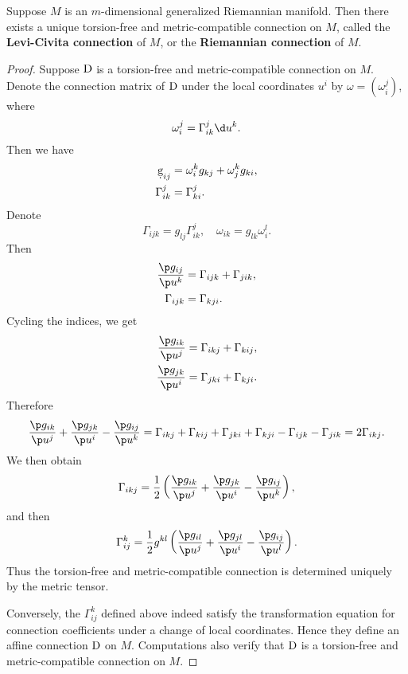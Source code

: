 \documentclass[11pt]{article}
\begin{document}
\begin{theorem}
    Suppose $M$ is an $m$-dimensional generalized Riemannian manifold. Then there exists a unique torsion-free and metric-compatible connection on $M$, called the \textbf{Levi-Civita connection} of $M$, or the \textbf{Riemannian connection} of $M$. 
\end{theorem}
\begin{proof}
    Suppose $\text{D}$ is a torsion-free and metric-compatible connection on $M$. Denote the connection matrix of $\text{D}$ under the local coordinates $u^i$ by $\omega = (\omega^j_i)$, where $$\omega^j_i = \Gamma^j_{ik}\d u^k.$$ Then we have 
    \begin{align*}
        \d g_{ij} &= \omega^k_i g_{kj} + \omega^k_j g_{ki}, \\
        \Gamma^j_{ik} &= \Gamma^j_{ki}.
    \end{align*}
    Denote $$\Gamma_{ijk} = g_{lj}\Gamma^j_{ik}, \quad \omega_{ik} = g_{lk}\omega^l_i.$$ Then 
    \begin{align*}
        \frac{\p g_{ij}}{\p u^k} &= \Gamma_{ijk} + \Gamma_{jik}, \\
        \Gamma_{ijk} &= \Gamma_{kji}.
    \end{align*}
    Cycling the indices, we get 
    \begin{align*}
        \frac{\p g_{ik}}{\p u^j} &= \Gamma_{ikj} + \Gamma_{kij}, \\
        \frac{\p g_{jk}}{\p u^i} &= \Gamma_{jki} + \Gamma_{kji}. 
    \end{align*}
    Therefore $$\frac{\p g_{ik}}{\p u^j} + \frac{\p g_{jk}}{\p u^i} - \frac{\p g_{ij}}{\p u^k} = \Gamma_{ikj} + \Gamma_{kij} + \Gamma_{jki} + \Gamma_{kji} - \Gamma_{ijk} - \Gamma_{jik} = 2\Gamma_{ikj}.$$ We then obtain $$\Gamma_{ikj} = \frac{1}{2}\left(\frac{\p g_{ik}}{\p u^j} + \frac{\p g_{jk}}{\p u^i} - \frac{\p g_{ij}}{\p u^k}\right),$$ and then $$\Gamma^k_{ij} = \frac{1}{2}g^{kl}\left(\frac{\p g_{il}}{\p u^j} + \frac{\p g_{jl}}{\p u^i} - \frac{\p g_{ij}}{\p u^l}\right).$$ Thus the torsion-free and metric-compatible connection is determined uniquely by the metric tensor.

    Conversely, the $\Gamma^k_{ij}$ defined above indeed satisfy the transformation equation for connection coefficients under a change of local coordinates. Hence they define an affine connection $\text{D}$ on $M$. Computations also verify that $\text{D}$ is a torsion-free and metric-compatible connection on $M$. 
\end{proof}
\end{document}
